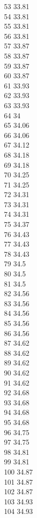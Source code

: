 53	33.81\\
54	33.81\\
55	33.81\\
56	33.81\\
57	33.87\\
58	33.87\\
59	33.87\\
60	33.87\\
61	33.93\\
62	33.93\\
63	33.93\\
64	34\\
65	34.06\\
66	34.06\\
67	34.12\\
68	34.18\\
69	34.18\\
70	34.25\\
71	34.25\\
72	34.31\\
73	34.31\\
74	34.31\\
75	34.37\\
76	34.43\\
77	34.43\\
78	34.43\\
79	34.5\\
80	34.5\\
81	34.5\\
82	34.56\\
83	34.56\\
84	34.56\\
85	34.56\\
86	34.56\\
87	34.62\\
88	34.62\\
89	34.62\\
90	34.62\\
91	34.62\\
92	34.68\\
93	34.68\\
94	34.68\\
95	34.68\\
96	34.75\\
97	34.75\\
98	34.81\\
99	34.81\\
100	34.87\\
101	34.87\\
102	34.87\\
103	34.93\\
104	34.93\\
